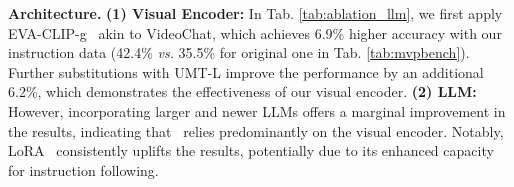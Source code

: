 \textbf{Architecture.}
\textbf{(1) Visual Encoder:}
In Tab. \ref{tab:ablation_llm}, we first apply EVA-CLIP-g~\cite{eva_clip} akin to VideoChat, 
which achieves 6.9\% higher accuracy with our instruction data (42.4\% \textit{vs.} 35.5\% for original one in Tab. \ref{tab:mvpbench}).
Further substitutions with UMT-L improve the performance by an additional 6.2\%,
which demonstrates the effectiveness of our visual encoder.
\textbf{(2) LLM:}
However,
incorporating larger and newer LLMs offers a marginal improvement in the results, 
indicating that \BenchName\  relies predominantly on the visual encoder. 
Notably,
LoRA~\cite{lora} consistently uplifts the results, 
potentially due to its enhanced capacity for instruction following.

\begin{table}[tp]
    \centering
    \setlength\tabcolsep{2.0pt}
    \vspace{-0.3cm}
    \caption{\textbf{System Prompt.} It should consider temporal evolution.}
    \label{tab:ablation_system_prompt}
    \vspace{-0.4cm}
\end{table}
